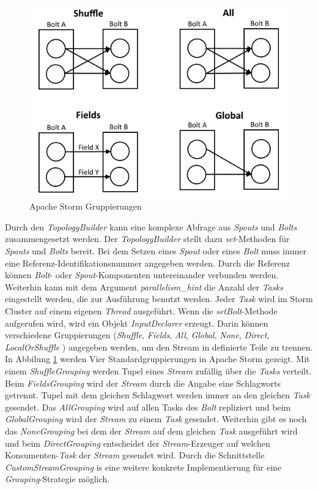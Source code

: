 \begin{figure}[htb!]
\centering
\includegraphics[width=1.0\textwidth]{bilder/stormGroupings.png}
\caption{Apache Storm Gruppierungen
\label{fig:stormGroupings}}
\end{figure}

Durch den \textit{TopologyBuilder} kann eine komplexe Abfrage aus \textit{Spouts} und \textit{Bolts} zusammengesetzt werden. Der \textit{TopologyBuilder} stellt dazu \textit{set}-Methoden für \textit{Spouts} und \textit{Bolts} bereit. Bei dem Setzen eines \textit{Spout} oder eines \textit{Bolt} muss immer eine Referenz-Identifikationsnummer angegeben werden. Durch die Referenz können \textit{Bolt}- oder \textit{Spout}-Komponenten untereinander verbunden werden. Weiterhin kann mit dem Argument \textit{parallelism\_hint} die Anzahl der \textit{Tasks} eingestellt werden, die zur Ausführung benutzt werden. Jeder \textit{Task} wird im Storm Cluster auf einem eigenen \textit{Thread} ausgeführt. Wenn die \textit{setBolt}-Methode aufgerufen wird, wird ein Objekt \textit{InputDeclarer} erzeugt. Darin können verschiedene Gruppierungen (\textit{Shuffle}, \textit{Fields}, \textit{All}, \textit{Global}, \textit{None}, \textit{Direct}, \textit{LocalOrShuffle} ) angegeben werden, um den Stream in definierte Teile zu trennen. In Abbilung \ref{fig:stormGroupings} werden Vier Standardgruppierungen in Apache Storm gezeigt. Mit einem \textit{ShuffleGrouping} werden Tupel eines \textit{Stream} zufällig über die \textit{Tasks} verteilt. Beim \textit{FieldsGrouping} wird der \textit{Stream} durch die Angabe eine Schlagworts getrennt. Tupel mit dem gleichen Schlagwort werden immer an den gleichen \textit{Task} gesendet. Das \textit{AllGrouping} wird auf allen Tasks des \textit{Bolt} repliziert und beim \textit{GlobalGrouping} wird der \textit{Stream} zu einem \textit{Task} gesendet. Weiterhin gibt es noch das \textit{NoneGrouping} bei dem der \textit{Stream} auf dem gleichen \textit{Task} ausgeführt wird und beim \textit{DirectGrouping} entscheidet der \textit{Stream}-Erzeuger auf welchen Konsumenten-\textit{Task} der \textit{Stream} gesendet wird. Durch die Schnittstelle \textit{CustomStreamGrouping} is eine weitere konkrete Implementierung für eine \textit{Grouping}-Strategie möglich. 

